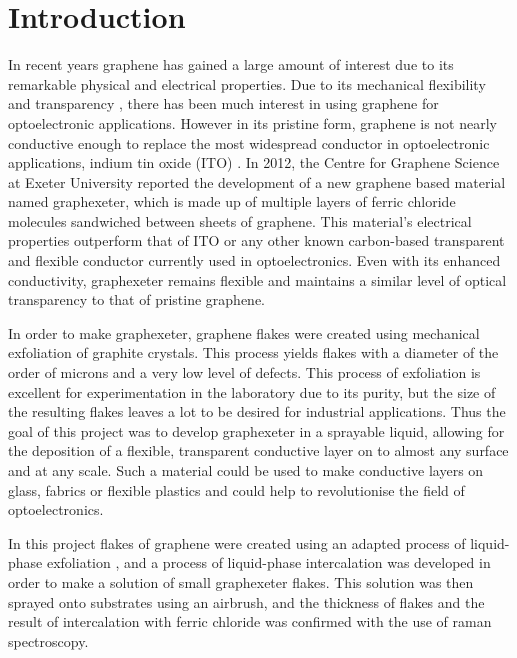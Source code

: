 \documentclass[12pt,titlepage]{article}
\begin{document}
	
	\tableofcontents
	\newpage
	\listoffigures
	\listoftables
	
	\newpage
	\section{Introduction}
	In recent years graphene has gained a large amount of interest due to its remarkable physical and electrical properties. Due to its mechanical flexibility and transparency \cite{Novoselov2011}, there has been much interest in using graphene for optoelectronic applications. However in its pristine form, graphene is not nearly conductive enough to replace the most widespread conductor in optoelectronic applications, indium tin oxide (ITO) \cite{Jo2012,Kumar2010}. In 2012, the Centre for Graphene Science at Exeter University reported the development of a new graphene based material \cite{Khrapach2012a} named graphexeter, which is made up of multiple layers of ferric chloride molecules sandwiched between sheets of graphene. This material's electrical properties outperform that of ITO or any other known carbon-based transparent and flexible conductor currently used in optoelectronics. Even with its enhanced conductivity, graphexeter remains flexible and maintains a similar level of optical transparency to that of pristine graphene.
	
	In order to make graphexeter, graphene flakes were created using mechanical exfoliation of graphite crystals. This process yields flakes with a diameter of the order of microns and a very low level of defects. This process of exfoliation is excellent for experimentation in the laboratory due to its purity, but the size of the resulting flakes leaves a lot to be desired for industrial applications. Thus the goal of this project was to develop graphexeter in a sprayable liquid, allowing for the deposition of a flexible, transparent conductive layer on to almost any surface and at any scale. Such a material could be used to make conductive layers on glass, fabrics or flexible plastics and could help to revolutionise the field of optoelectronics.
	
	In this project flakes of graphene were created using an adapted process of liquid-phase exfoliation \cite{Hernandez2008}, and a process of liquid-phase intercalation was developed in order to make a solution of small graphexeter flakes. This solution was then sprayed onto substrates using an airbrush, and the thickness of flakes and the result of intercalation with ferric chloride was confirmed with the use of raman spectroscopy. 
	
\end{document}
